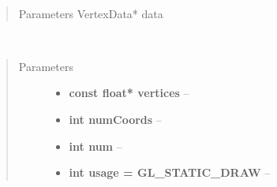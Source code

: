 \documentclass[letterpaper,10pt,english]{sphinxmanual}
\begin{document}

\begin{fulllineitems}
\label{gl:VBO::updateVertexData__VertexDataP}~\begin{quote}\begin{description}
\item[{Parameters VertexData* data}] \leavevmode


\end{description}\end{quote}

\end{fulllineitems}


\begin{fulllineitems}
\label{gl:VBO::setVertices__floatCP.i.i.i}~\begin{quote}\begin{description}
\item[{Parameters}] \leavevmode\begin{itemize}
\item {} 
\textbf{const float* vertices} -- 

\item {} 
\textbf{int numCoords} -- 

\item {} 
\textbf{int num} -- 

\item {} 
\textbf{int usage = GL\_STATIC\_DRAW} -- 

\end{itemize}

\end{description}\end{quote}

\end{fulllineitems}

\end{document}

